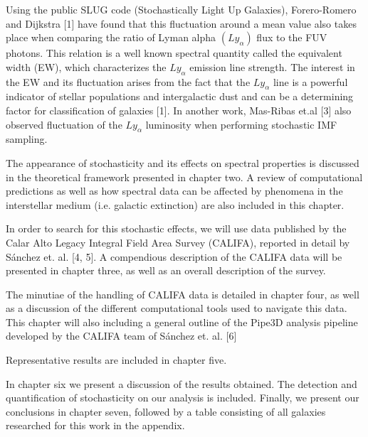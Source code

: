 Using the public SLUG code (Stochastically Light Up Galaxies), Forero-Romero and Dijkstra [1] have found that this fluctuation
around a mean value also takes place when comparing the ratio of Lyman alpha $\left( Ly_{\alpha} \right)$ flux to the FUV photons.
This relation is a well known spectral quantity called the equivalent width (EW), which characterizes the $Ly_{\alpha}$ emission
line strength. The interest in the EW and its fluctuation arises from the fact that the $Ly_{\alpha}$ line is a powerful
indicator of stellar populations and intergalactic dust and can be a determining factor for classification of galaxies [1]. In
another work, Mas-Ribas et.al [3] also observed fluctuation of the $Ly_{\alpha}$ luminosity when performing stochastic IMF
sampling.


The appearance of stochasticity and its effects on spectral properties is discussed in the theoretical framework presented in chapter
two. A review of computational predictions as well as how spectral data can be affected by phenomena in the interstellar medium (i.e.
galactic extinction) are also included in this chapter.


In order to search for this stochastic effects, we will use data published by the Calar Alto Legacy Integral Field Area Survey
(CALIFA), reported in detail by S\'anchez et. al. [4, 5]. A compendious description of the CALIFA data will be presented in chapter
three, as well as an overall description of the survey.


The minutiae of the handling of CALIFA data is detailed in chapter four, as well as a discussion of the different computational
tools used to navigate this data. This chapter will also including a general outline of the Pipe3D analysis pipeline developed
by the CALIFA team of S\'anchez et. al. [6]



Representative results are included in chapter five.


In chapter six we present a discussion of the results obtained. The detection and quantification of stochasticity on our analysis is included.
Finally, we present our conclusions in chapter seven, followed by a table consisting of all galaxies researched for this work in the appendix.
